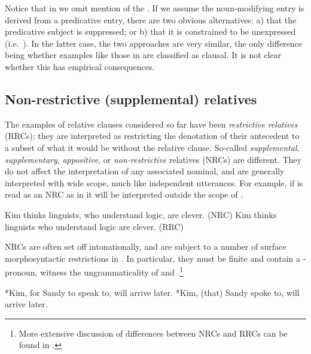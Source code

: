 \documentclass[output=paper,nonflat,draftmode]{./langsci/langscibook}
\begin{document}
Notice that in  we omit mention of the . If we assume the
noun-modifying entry is derived from a predicative entry, there are two obvious
alternatives: a) that the predicative subject is suppressed; or b) that it is constrained
to be unexpressed (i.e.\ ). In the latter case, the two approaches are very
similar, the only difference being whether examples like those in  are
classified as clausal. It is not clear whether this has empirical consequences.

\subsection{Non-restrictive (supplemental) relatives}
\label{sec:rc-non-restr-suppl}

The examples of relative clauses considered so far have been \emph{restrictive relatives} (RRCs); they are
interpreted as restricting the denotation of their antecedent to a subset of what
it would be without the relative clause. So-called \emph{supplemental}, \emph{supplementary}, \emph{appositive}, or \emph{non-restrictive}
relatives (NRCs) are different. They do not affect the interpretation of any associated
nominal, and are generally interpreted with wide scope, much like independent
utterances. For example, if  is read as an NRC as in 
it will be interpreted outside the scope of .
\begin{exe}\ex\begin{xlist}\label{x:rc-106}
  \ex\label{x:rc-107} Kim thinks linguists, who understand logic, are clever. \hfill (NRC)
  \ex\label{x:rc-108} Kim thinks linguists who understand logic are clever. \hfill (RRC)
\end{xlist}\end{exe}
NRCs are often set off intonationally, and are subject to a number of surface
morphosyntactic restrictions in .  In particular, they must be finite and contain a
-pronoun, witness the ungrammaticality of  and
.\footnote{More extensive discussion of differences between NRCs and RRCs can
  be found in \cite{Arnold07}.}
\begin{exe}\ex\begin{xlist}
  \ex\label{x:rc-109} *Kim, for Sandy to speak to, will arrive later.
  \ex \label{x:rc-110} *Kim, (that) Sandy spoke to, will arrive later.
\end{xlist}\end{exe}
\end{document}
